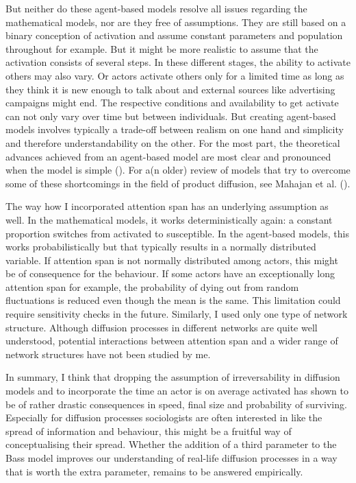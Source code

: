 \documentclass[a4paper,12pt]{article}
\begin{document}
But neither do these agent-based models resolve all issues regarding the mathematical models, nor are they free of assumptions. They are still based on a binary conception of activation and assume constant parameters and population throughout for example. But it might be more realistic to assume that the activation consists of several steps. In these different stages, the ability to activate others may also vary. Or actors activate others only for a limited time as long as they think it is new enough to talk about and external sources like advertising campaigns might end. The respective conditions and availability to get activate can not only vary over time but between individuals. But creating agent-based models involves typically a trade-off between realism on one hand and simplicity and therefore understandability on the other. For the most part, the theoretical advances achieved from an agent-based model are most clear and pronounced when the model is simple  (\cite{flacheSocialDynamicsBottom2011}). For a(n older) review of models that try to overcome some of these shortcomings in the field of product diffusion, see Mahajan et al. (\citeyear{mahajanNewProductDiffusion1990}). 

The way how I incorporated attention span has an underlying assumption as well. In the mathematical models, it works deterministically again: a constant proportion switches from activated to susceptible. In the agent-based models, this works probabilistically but that typically results in a normally distributed variable. If attention span is not normally distributed among actors, this might be of consequence for the behaviour. If some actors have an exceptionally long attention span for example, the probability of dying out from random fluctuations is reduced even though the mean is the same. This limitation could require sensitivity checks in the future. Similarly, I used only one type of network structure. Although diffusion processes in different networks are quite well understood, potential interactions between attention span and a wider range of network structures have not been studied by me.

In summary, I think that dropping the assumption of irreversability in diffusion models and to incorporate the time an actor is on average activated has shown to be of rather drastic consequences in speed, final size and probability of surviving. Especially for diffusion processes sociologists are often interested in like the spread of information and behaviour, this might be a fruitful way of conceptualising their spread. Whether the addition of a third parameter to the Bass model improves our understanding of real-life diffusion processes in a way that is worth the extra parameter, remains to be answered empirically.
\end{document}
